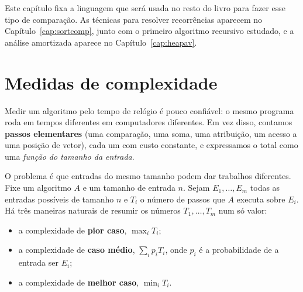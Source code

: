 Este capítulo fixa a linguagem que será usada no resto do livro para fazer esse tipo de comparação. As técnicas para resolver recorrências aparecem no Capítulo~\ref{cap:sortcomp}, junto com o primeiro algoritmo recursivo estudado, e a análise amortizada aparece no Capítulo~\ref{cap:heapav}.

\section{Medidas de complexidade}\label{sec:medidas}
\begin{intuicao}
Medir um algoritmo pelo tempo de relógio é pouco confiável: o mesmo programa roda em tempos diferentes em computadores diferentes. Em vez disso, contamos \textbf{passos elementares} (uma comparação, uma soma, uma atribuição, um acesso a uma posição de vetor), cada um com custo constante, e expressamos o total como uma \emph{função do tamanho da entrada}.
\end{intuicao}

O problema é que entradas do mesmo tamanho podem dar trabalhos diferentes. Fixe um algoritmo $A$ e um tamanho de entrada $n$. Sejam $E_1,\dots,E_m$ todas as entradas possíveis de tamanho $n$ e $T_i$ o número de passos que $A$ executa sobre $E_i$. Há três maneiras naturais de resumir os números $T_1,\dots,T_m$ num só valor:
\begin{itemize}
  \item a complexidade de \textbf{pior caso}, $\max_iT_i$;
  \item a complexidade de \textbf{caso médio}, $\sum_ip_iT_i$, onde $p_i$ é a probabilidade de a entrada ser $E_i$;
  \item a complexidade de \textbf{melhor caso}, $\min_iT_i$.
\end{itemize}

